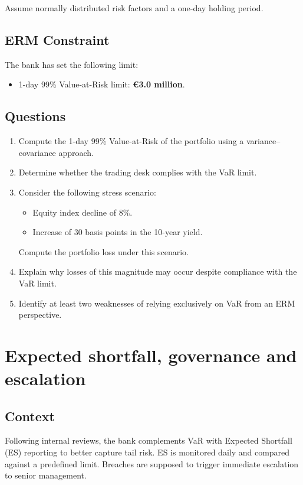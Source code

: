 \documentclass[11pt]{article}
\begin{document}
Assume normally distributed risk factors and a one-day holding period.

\subsection*{ERM Constraint}

The bank has set the following limit:
\begin{itemize}
    \item 1-day 99\% Value-at-Risk limit: \textbf{€3.0 million}.
\end{itemize}

\subsection*{Questions}

\begin{enumerate}
    \item Compute the 1-day 99\% Value-at-Risk of the portfolio using a
    variance--covariance approach.
    \item Determine whether the trading desk complies with the VaR limit.
    \item Consider the following stress scenario:
    \begin{itemize}
        \item Equity index decline of 8\%.
        \item Increase of 30 basis points in the 10-year yield.
    \end{itemize}
    Compute the portfolio loss under this scenario.
    \item Explain why losses of this magnitude may occur despite compliance
    with the VaR limit.
    \item Identify at least two weaknesses of relying exclusively on VaR from
    an ERM perspective.
\end{enumerate}
\pagebreak

\section{Expected shortfall, governance and escalation}

\subsection*{Context}

Following internal reviews, the bank complements VaR with Expected Shortfall
(ES) reporting to better capture tail risk. ES is monitored daily and compared
against a predefined limit. Breaches are supposed to trigger immediate
escalation to senior management.
\end{document}
